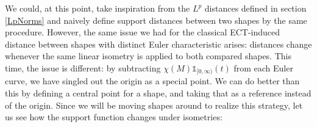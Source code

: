 \documentclass[a4paper]{article}
\newcommand{\ECT}{\operatorname{ECT}}
\newcommand{\bb}{\mathbb}
\begin{document}

We could, at this point, take inspiration from the $L^p$ distances defined in section \ref{LpNorms} and naively define support distances between two shapes by the same procedure. However, the same issue we had for the classical ECT-induced distance between shapes with distinct Euler characteristic arises: distances change whenever the same linear isometry is applied to both compared shapes. This time, the issue is different: by subtracting $\chi(M) \bb 1_{[0, \infty)}(t)$ from each Euler curve, we have singled out the origin as a special point. We can do better than this by defining a central point for a shape, and taking that as a reference instead of the origin. Since we will be moving shapes around to realize this strategy, let us see how the support function changes under isometries:
\end{document}
